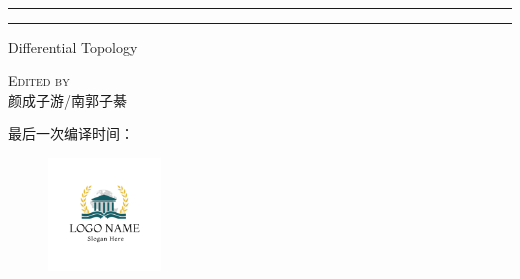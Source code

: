 \begin{titlepage}
\vspace{0.75\baselineskip} %

{\huge \calligra{ \textbf{} }\\} %

\vspace{0.75\baselineskip} %

\rule{\textwidth}{0.4pt}\vspace*{-\baselineskip}\vspace{3.2pt} %
\rule{\textwidth}{1.6pt} %

\vspace{2\baselineskip} %


\LARGE{Differential Topology} 

\vspace*{3\baselineskip} %



\vspace{0.5\baselineskip} 

{\scshape   \LARGE Edited by\\  颜成子游/南郭子綦} %
\vspace{0.2\baselineskip} 


\vfill 
{最后一次编译时间：\DTMnow}

\begin{figure}[!h]
    \centering
    \includegraphics[width = 3cm, height= 3cm]{resource/icon.png}%
\end{figure}
\vspace{0.3\baselineskip} 

\end{titlepage}